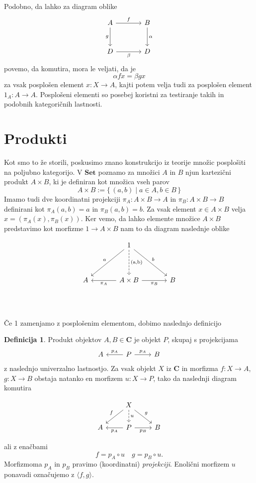 \documentclass[12pt,a4paper]{book}
\theoremstyle{definition}
\newtheorem{definicija}{Definicija}[chapter]
\theoremstyle{plain}
\theoremstyle{definition}
\theoremstyle{remark}
\newcommand{\cat}[1]{\textbf{#1}}
\renewcommand{\set}[1]{\{\,#1\,\}}
\begin{document}
Podobno, da lahko za diagram oblike 
$$\begin{tikzcd}[column sep=large, row sep=large]
A \ar[d, "g"'] \ar[r, "f"] & B \ar[d, "\alpha"] \\
D \ar[r, "\beta"'] & D
\end{tikzcd}$$
povemo, da komutira, mora le veljati, da je 
$$\alpha f x = \beta g x$$
za vsak posplošen element $x : X \to A$, kajti potem velja tudi za posplošen element $1_A : A \to A$. Posplošeni elementi so posebej koristni za testiranje takih in podobnih kategoričnih lastnosti.

\section{Produkti}
Kot smo to že storili, poskusimo znano konstrukcijo iz teorije množic posplošiti na poljubno kategorijo. V $\cat{Set}$ poznamo za množici $A$ in $B$ njun kartezični produkt $A \times B$, ki je definiran kot množica vseh parov 
$$A \times B := \set{(a,b) \mid a \in A, b \in B}$$
Imamo tudi dve koordinatni projekciji $\pi_A : A\times B \to A$ in $\pi_B : A \times B \to B$ definirani kot $\pi_A(a,b) = a$ in $\pi_B(a,b) = b$. Za vsak element $x \in A \times B$ velja $x = (\pi_A(x), \pi_B(x))$. Ker vemo, da lahko elemente množice $A \times B$ predstavimo kot morfizme $1 \to A \times B$ nam to da diagram naslednje oblike

$$ \begin{tikzcd}[row sep=huge, column sep=large]
&  1 \ar[dl, "a"'] \ar[d, dashed, "\text{(a,b)}", font=\large] \ar[dr, "b"] & \\
A & \ar[l, "\pi_A"] A \times B \ar[r, "\pi_B"'] & B \\
\end{tikzcd} $$

Če 1 zamenjamo z posplošenim elementom, dobimo naslednjo definicijo

\begin{definicija}
Produkt objektov $A,B \in \cat{C}$ je objekt $P$, skupaj s projekcijama
$$\begin{tikzcd}
A & P \ar[l, "p_A"'] \ar[r, "p_A"] & B
\end{tikzcd}$$
z naslednjo univerzalno lastnostjo. Za vsak objekt $X$ iz $\cat{C}$ in morfizma $f : X \to A$, $g : X \to B$ obstaja natanko en morfizem $u : X \to P$, tako da naslednji diagram komutira

$$\begin{tikzcd}
& X \ar[ld, "f"'] \ar[d, dashed, "u"] \ar[rd, "g"] & \\
A & P \ar[l, "p_A"] \ar[r, "p_B"'] & B
\end{tikzcd}$$

ali z enačbami
$$f = p_A \circ u \quad g = p_B \circ u.$$
Morfizmoma $p_A$ in $p_B$ pravimo (koordinatni) \textit{projekciji}. Enolični morfizem $u$ ponavadi označujemo z $\langle f,g \rangle$.
\end{definicija}
\end{document}
